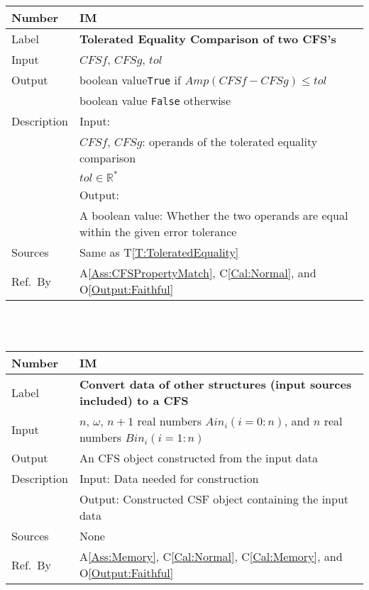 \documentclass[12pt]{article}
\newcommand{\colAwidth}{0.13\textwidth}
\newcommand{\colBwidth}{0.82\textwidth}
\newcommand{\tref}[1]{T\ref{#1}}
\newcommand{\aref}[1]{A\ref{#1}}
\newcommand{\calref}[1]{C\ref{#1}}
\newcommand{\oref}[1]{O\ref{#1}}
\newcounter{instnum} %
\begin{document}
\noindent
\begin{minipage}{\textwidth}
	\renewcommand*{\arraystretch}{1.5}
	\begin{tabular}{| p{\colAwidth} | p{\colBwidth}|}
		\hline
		\rowcolor[gray]{0.9}
		Number& IM{instnum}\theinstnum \label{IM:ToleratedEquality}\\
		\hline
		Label& \bf Tolerated Equality Comparison of two CFS's \\
		\hline
		Input& $\mathit{CFSf}$, $\mathit{CFSg}$, $\mathit{tol}$\\
		\hline
		Output& boolean value\texttt{True} if $\mathit{Amp}(\mathit{CFSf}-\mathit{CFSg})\leq \mathit{tol}$\\
		&boolean value \texttt{False} otherwise\\
		\hline
		Description&Input:\\
		&$\mathit{CFSf}$, $\mathit{CFSg}$: operands of the tolerated equality comparison\\
		&$\mathit{tol}\in\mathbb{R}^{*}$\\
		&Output:\\
		& A boolean value: Whether the two operands are equal within the given error tolerance\\
		\hline
		Sources&Same as \tref{T:ToleratedEquality}		\\
		\hline
		Ref.\ By & \aref{Ass:CFSPropertyMatch}, \calref{Cal:Normal}, and \oref{Output:Faithful}
		
		
		\\
		\hline
	\end{tabular}
\end{minipage}\\
~\newline

\noindent
\begin{minipage}{\textwidth}
	\renewcommand*{\arraystretch}{1.5}
	\begin{tabular}{| p{\colAwidth} | p{\colBwidth}|}
		\hline
		\rowcolor[gray]{0.9}
		Number& IM{instnum}\theinstnum \label{IM:ConvertTo}\\
		\hline
		Label& \bf Convert data of other structures (input sources included) to a CFS \\
		\hline
		Input& $n$, $\omega$, $n+1$ real numbers $\mathit{Ain}_{i} (i=0:n)$, and $n$ real numbers $\mathit{Bin}_{i} (i=1:n)$\\
		\hline
		Output& An CFS object constructed from the input data\\
		Description&Input: Data needed for construction\\
		&Output: Constructed CSF object containing the input data\\
		\hline
		Sources&None		\\
		\hline
		Ref.\ By &  \aref{Ass:Memory}, \calref{Cal:Normal}, \calref{Cal:Memory}, and \oref{Output:Faithful}
		
		
		\\
		\hline
	\end{tabular}
\end{minipage}\\
~\newline
\end{document}
